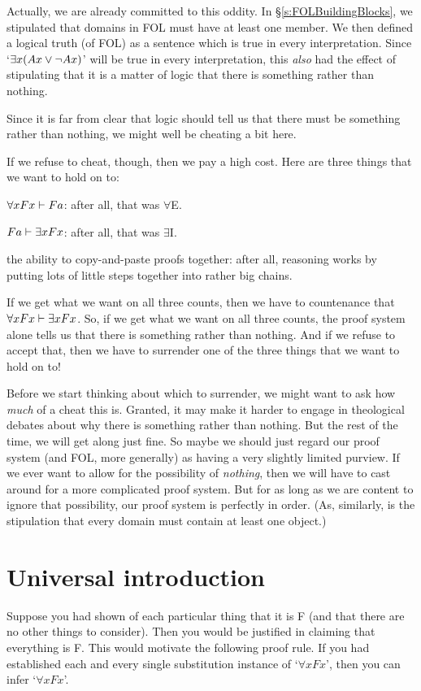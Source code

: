 Actually, we are already committed to this oddity. In \S\ref{s:FOLBuildingBlocks}, we stipulated that domains in FOL must have at least one member. We then defined a logical truth (of FOL) as a sentence which is true in every interpretation. Since `$\exists x(Ax\vee\neg Ax)$' will be true in every interpretation, this \emph{also} had the effect of stipulating that it is a matter of logic that there is something rather than nothing.

Since it is far from clear that logic should tell us that there must be something rather than nothing, we might well be cheating a bit here.

If we refuse to cheat, though, then we pay a high cost. Here are three things that we want to hold on to:
	\begin{ebullet}
		\item $\forall x Fx \vdash Fa$: after all, that was $\forall$E.
		\item $Fa \vdash \exists x Fx$: after all, that was $\exists$I.
		\item the ability to copy-and-paste proofs together: after all, reasoning works by putting lots of little steps together into rather big chains.
	\end{ebullet}
If we get what we want on all three counts, then we have to countenance that $\forall xFx \vdash \exists x Fx$. So, if we get what we want on all three counts, the proof system alone tells us that there is something rather than nothing. And if we refuse to accept that, then we have to surrender one of the three things that we want to hold on to!

Before we start thinking about which to surrender, we might want to ask how \emph{much} of a cheat this is. Granted, it may make it harder to engage in theological debates about why there is something rather than nothing. But the rest of the time, we will get along just fine. So maybe we should just regard our proof system (and FOL, more generally) as having a very slightly limited purview. If we ever want to allow for the possibility of \emph{nothing}, then we will have to cast around for a more complicated proof system. But for as long as we are content to ignore that possibility, our proof system is perfectly in order. (As, similarly, is the stipulation that every domain must contain at least one object.)


\section{Universal introduction}
Suppose you had shown of each particular thing that it is F (and that there are no other things to consider). Then you would be justified in claiming that everything is F. This would motivate the following proof rule. If you had established each and every single substitution instance of `$\forall x Fx$', then you can infer `$\forall x Fx$'.

